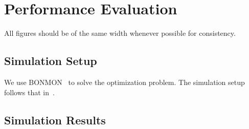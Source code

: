 \chapter{Performance Evaluation}
\label{chap:results}

All figures should be of the same width whenever possible for consistency.

\section{Simulation Setup}

We use BONMON~\cite{bonmin} to solve the optimization problem.
The simulation setup follows that in~\cite{TR37-868}.

\section{Simulation Results}

